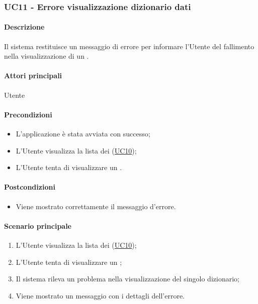 
\subsubsection{UC11 - Errore visualizzazione dizionario dati}\label{UC11}
\paragraph*{Descrizione}
Il sistema restituisce un messaggio di errore per informare l'Utente del fallimento nella visualizzazione di un .

\paragraph*{Attori principali}
Utente

\paragraph*{Precondizioni}
\begin{itemize}
  \item L'applicazione è stata avviata con successo;
  \item L'Utente visualizza la lista dei  (\hyperref[UC10]{UC10});
  \item L'Utente tenta di visualizzare un .
\end{itemize}

\paragraph*{Postcondizioni}
\begin{itemize}
  \item Viene mostrato correttamente il messaggio d'errore.
\end{itemize}

\paragraph*{Scenario principale}
\begin{enumerate}
  \item L'Utente visualizza la lista dei  (\hyperref[UC10]{UC10});
  \item L'Utente tenta di visualizzare un ;
  \item Il sistema rileva un problema nella visualizzazione del singolo dizionario;
  \item Viene mostrato un messaggio con i dettagli dell'errore.
\end{enumerate}
